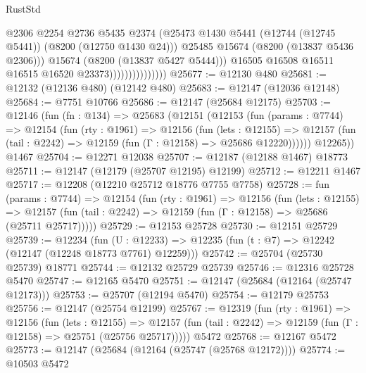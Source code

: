 \begin{lexlean}{RustStd}
\begin{coremodule}
                                      @2306
                                      @2254
                                      @2736
                                      @5435
                                      @2374
                                      (@25473
                                        @1430
                                        @5441
                                        (@12744 (@12745 @5441))
                                        (@8200 (@12750 @1430 @24)))
                                      @25485
                                      @15674
                                      (@8200 (@13837 @5436 @2306)))
                                    @15674
                                    (@8200 (@13837 @5427 @5444)))
                                  @16505
                                  @16508
                                  @16511
                                  @16515
                                  @16520
                                  @23373)))))))))))))))
@25677 := @12130 @480
@25681 := @12132 (@12136 @480) (@12142 @480)
@25683 := @12147 (@12036 @12148)
@25684 := @7751 @10766
@25686 := @12147 (@25684 @12175)
@25703 := @12146
    (fun (fn : @134) =>
    @25683
      (@12151
        (@12153
          (fun (params : @7744) =>
          @12154
            (fun (rty : @1961) =>
            @12156
              (fun (lets : @12155) =>
              @12157 (fun (tail : @2242) => @12159 (fun (Γ : @12158) => @25686 @12220))))))
        @12265))
    @1467
@25704 := @12271 @12038
@25707 := @12187 (@12188 @1467) @18773
@25711 := @12147 (@12179 (@25707 @12195) @12199)
@25712 := @12211 @1467
@25717 := @12208 (@12210 @25712 @18776 @7755 @7758)
@25728 := fun (params : @7744) =>
  @12154
    (fun (rty : @1961) =>
    @12156
      (fun (lets : @12155) =>
      @12157 (fun (tail : @2242) => @12159 (fun (Γ : @12158) => @25686 (@25711 @25717)))))
@25729 := @12153 @25728
@25730 := @12151 @25729
@25739 := @12234
    (fun (U : @12233) => @12235 (fun (t : @7) => @12242 (@12147 (@12248 @18773 @7761) @12259)))
@25742 := @25704 (@25730 @25739) @18771
@25744 := @12132 @25729 @25739
@25746 := @12316 @25728 @5470
@25747 := @12165 @5470
@25751 := @12147 (@25684 (@12164 (@25747 @12173)))
@25753 := @25707 (@12194 @5470)
@25754 := @12179 @25753
@25756 := @12147 (@25754 @12199)
@25767 := @12319
    (fun (rty : @1961) =>
    @12156
      (fun (lets : @12155) =>
      @12157 (fun (tail : @2242) => @12159 (fun (Γ : @12158) => @25751 (@25756 @25717)))))
    @5472
@25768 := @12167 @5472
@25773 := @12147 (@25684 (@12164 (@25747 (@25768 @12172))))
@25774 := @10503 @5472

\end{coremodule}
\end{lexlean}
